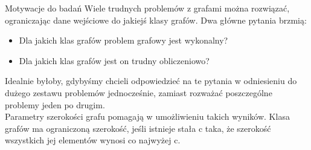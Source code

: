 \documentclass[polish]{beamer}
\begin{document}
\pgtitleframe



\begin{frame}{Motywacje do badań}
    Wiele trudnych problemów z grafami można rozwiązać, ograniczając dane wejściowe do jakiejś klasy grafów.
    Dwa główne pytania brzmią: 
    \begin{itemize}
        \item Dla jakich klas grafów problem grafowy jest wykonalny?
        \item Dla jakich klas grafów jest on trudny obliczeniowo?
    \end{itemize}
    Idealnie byłoby, gdybyśmy chcieli odpowiedzieć na te pytania w odniesieniu do dużego zestawu problemów 
    jednocześnie, zamiast rozważać poszczególne problemy jeden po drugim.\\
    Parametry szerokości grafu pomagają w umożliwieniu takich wyników. Klasa grafów ma ograniczoną 
    szerokość, jeśli istnieje stała c taka, że szerokość wszystkich jej elementów wynosi co najwyżej c.
\end{frame}
\end{document}
